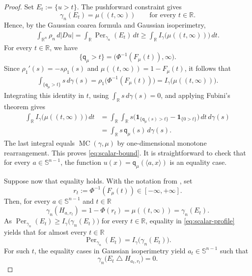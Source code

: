 \documentclass[11pt]{amsart}
\theoremstyle{definition}
\newcommand{\R}{\mathbb{R}}
\newcommand{\qmu}{\mathsf q_{\mu}}
\newcommand{\MC}{\operatorname{MC}}
\newcommand{\Perg}{\operatorname{Per}_{\gamma_n}}
\begin{document}
\begin{proof}
Set $E_t:=\{u>t\}$. The pushforward constraint gives
\[
  \gamma_n(E_t)=\mu((t,\infty))
  \qquad\text{for every }t\in\R.
\]
Hence, by the Gaussian coarea formula and Gaussian isoperimetry,
\begin{align}\label{eq:scalar-profile}
  \int_{\R^n}\rho_n\,d|Du|
  =\int_\R \Perg(E_t)\,dt
  \geq
  \int_\R I_\gamma\bigl(\mu((t,\infty))\bigr)\,dt.
\end{align}
For every $t\in\R$, we have
\[
  \{\qmu>t\}
  =
  \bigl(\Phi^{-1}(F_\mu(t)),\infty\bigr).
\]
Since $\rho_1'(s)=-s\rho_1(s)$ and
$\mu((t,\infty))=1-F_\mu(t)$, it follows that
\begin{align*}
  \int_{\{\qmu>t\}}s\,d\gamma(s)
  =
  \rho_1\bigl(\Phi^{-1}(F_\mu(t))\bigr)
  =
  I_\gamma\bigl(\mu((t,\infty))\bigr).
\end{align*}
Integrating this identity in $t$, using
$\int_\R s\,d\gamma(s)=0$, and applying Fubini's theorem gives
\begin{align*}
  \int_\R I_\gamma\bigl(\mu((t,\infty))\bigr)\,dt
  &=
  \int_\R\int_\R
  s\bigl(
    \mathbf 1_{\{\qmu(s)>t\}}
    -\mathbf 1_{\{0>t\}}
  \bigr)\,dt\,d\gamma(s) \\
  &=
  \int_\R s\,\qmu(s)\,d\gamma(s).
\end{align*}
The last integral equals $\MC(\gamma,\mu)$ by one-dimensional
monotone rearrangement. This proves \eqref{eq:scalar-bound}. It is
straightforward to check that for every $a\in\mathbb S^{n-1}$, the
function $u(x)=\qmu(\langle a,x\rangle)$ is an equality case.

Suppose now that equality holds. With the notation from
, set
\[
  r_t:=\Phi^{-1}(F_\mu(t))\in[-\infty,+\infty].
\]
Then, for every $a\in\mathbb S^{n-1}$ and $t \in \R$
\[
  \gamma_n(H_{a,r_t})
  =
  1-\Phi(r_t)
  =
  \mu((t,\infty))
  =
  \gamma_n(E_t).
\]
As $\Perg(E_t)
  \ge
  I_\gamma\bigl(\gamma_n(E_t)\bigr)$ for every $t \in \R$, equality in \eqref{eq:scalar-profile} yields that for almost every $t \in \R$
\[
\Perg(E_t)
  =
  I_\gamma\bigl(\gamma_n(E_t)\bigr).
\]
For such $t$, the equality cases in Gaussian isoperimetry yield
$a_t\in\mathbb S^{n-1}$ such that
\[
  \gamma_n\bigl(E_t\mathbin{\triangle}H_{a_t,r_t}\bigr)=0.
\]


\end{proof}
\end{document}
